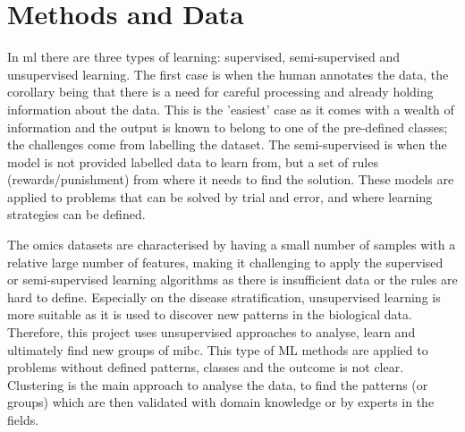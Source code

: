 \section{Methods and Data} \label{s:lit:computational}

\vspace{3mm}
\vspace{3mm}

In \acrfull{ml} there are three types of learning: supervised, semi-supervised and unsupervised learning. The first case is when the human annotates the data, the corollary being that there is a need for careful processing and already holding information about the data. This is the 'easiest' case as it comes with a wealth of information and the output is known to belong to one of the pre-defined classes; the challenges come from labelling the dataset. The semi-supervised is when the model is not provided labelled data to learn from, but a set of rules (rewards/punishment) from where it needs to find the solution. These models are applied to problems that can be solved by trial and error, and where learning strategies can be defined. 

The omics datasets are characterised by having a small number of samples with a relative large number of features, making it challenging to apply the supervised or semi-supervised learning algorithms as there is insufficient data or the rules are hard to define. Especially on the disease stratification, unsupervised learning is more suitable as it is used to discover new patterns in the biological data. Therefore, this project uses unsupervised approaches to analyse, learn and ultimately find new groups of \acrlong{mibc}. This type of ML methods are applied to problems without defined patterns, classes and the outcome is not clear. Clustering is the main approach to analyse the data, to find the patterns (or groups) which  are then validated with domain knowledge or by experts in the fields. 

